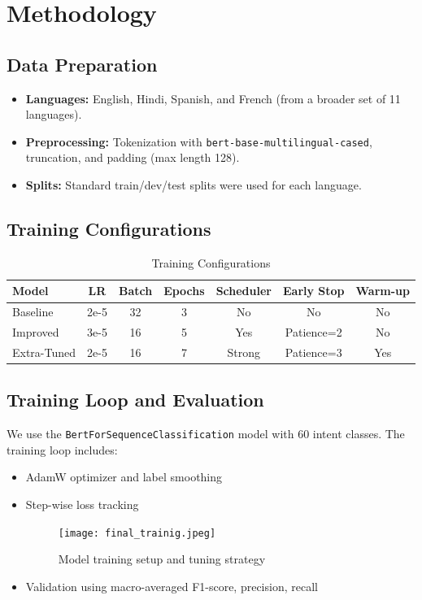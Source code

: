 \documentclass{ecai}
\begin{document}
\section{Methodology}

\subsection{Data Preparation}
\begin{itemize}
    \item \textbf{Languages:} English, Hindi, Spanish, and French (from a broader set of 11 languages).
    \item \textbf{Preprocessing:} Tokenization with \texttt{bert-base-multilingual-cased}, truncation, and padding (max length 128).
    \item \textbf{Splits:} Standard train/dev/test splits were used for each language.
\end{itemize}

\subsection{Training Configurations}
\begin{table}[H]
\centering
\caption{Training Configurations}
\begin{tabular}{lcccccc}
\toprule
Model & LR & Batch & Epochs & Scheduler & Early Stop & Warm-up \\
\midrule
Baseline     & 2e-5 & 32 & 3 & No    & No          & No  \\
Improved     & 3e-5 & 16 & 5 & Yes   & Patience=2  & No  \\
Extra-Tuned  & 2e-5 & 16 & 7 & Strong& Patience=3  & Yes \\
\bottomrule
\end{tabular}
\end{table}

\subsection{Training Loop and Evaluation}
We use the \texttt{BertForSequenceClassification} model with 60 intent classes. The training loop includes:
\begin{itemize}
    \item AdamW optimizer and label smoothing
    \item Step-wise loss tracking
    
    \begin{figure}[h]
        \centering
        \texttt{[image: final\_trainig.jpeg]}
        \caption{Model training setup and tuning strategy}
    \end{figure}

    \textbf{}
    \item Validation using macro-averaged F1-score, precision, recall
\end{itemize}
\end{document}
